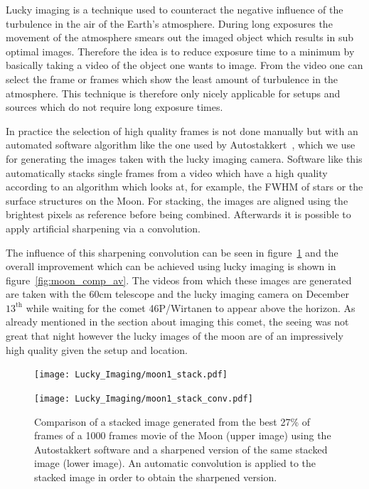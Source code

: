\documentclass{article}
\begin{document}
Lucky imaging is a technique used to counteract the negative influence of the turbulence in the air of the Earth's atmosphere. During long exposures the movement of the atmosphere smears out the imaged object which results in sub optimal images. Therefore the idea is to reduce exposure time to a minimum by basically taking a video of the object one wants to image. From the video one can select the frame or frames which show the least amount of turbulence in the atmosphere. This technique is therefore only nicely applicable for setups and sources which do not require long exposure times.

In practice the selection of high quality frames is not done manually but with an automated software algorithm like the one used by Autostakkert~\parencite{autostakkert}, which we use for generating the images taken with the lucky imaging camera. Software like this automatically stacks single frames from a video which have a high quality according to an algorithm which looks at, for example, the FWHM of stars or the surface structures on the Moon. For stacking, the images are aligned using the brightest pixels as reference before being combined. Afterwards it is possible to apply artificial sharpening via a convolution. 

The influence of this sharpening convolution can be seen in figure~\ref{fig:moon_comp_sharp} and the overall improvement which can be achieved using lucky imaging is shown in figure~\ref{fig:moon_comp_av}. The videos from which these images are generated are taken with the 60cm telescope and the lucky imaging camera on December $13^\text{th}$ while waiting for the comet 46P/Wirtanen to appear above the horizon. As already mentioned in the section about imaging this comet, the seeing was not great that night however the lucky images of the moon are of an impressively high quality given the setup and location. 

\begin{figure}[H]
\centering
\begin{minipage}{1.\textwidth}
\centering
  \texttt{[image: Lucky\_Imaging/moon1\_stack.pdf]}
\end{minipage}
\begin{minipage}{1.\textwidth}
\centering
  \texttt{[image: Lucky\_Imaging/moon1\_stack\_conv.pdf]}
\end{minipage}
    \caption{Comparison of a stacked image generated from the best 27\% of frames of a 1000 frames movie of the Moon (upper image) using the Autostakkert software \parencite{autostakkert} and a sharpened version of the same stacked image (lower image). An automatic convolution is applied to the stacked image in order to obtain the sharpened version.} 
    \label{fig:moon_comp_sharp}
\end{figure}
\end{document}
